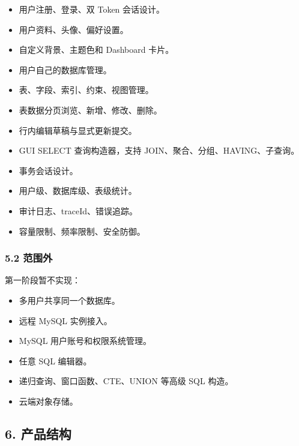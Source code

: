 \documentclass[
  a4paper,
  UTF8]{ctexart}
\providecommand{\tightlist}{%
  \setlength{\itemsep}{0pt}\setlength{\parskip}{0pt}}
\begin{document}
\begin{itemize}
\tightlist
\item
  用户注册、登录、双 Token 会话设计。
\item
  用户资料、头像、偏好设置。
\item
  自定义背景、主题色和 Dashboard 卡片。
\item
  用户自己的数据库管理。
\item
  表、字段、索引、约束、视图管理。
\item
  表数据分页浏览、新增、修改、删除。
\item
  行内编辑草稿与显式更新提交。
\item
  GUI SELECT 查询构造器，支持 JOIN、聚合、分组、HAVING、子查询。
\item
  事务会话设计。
\item
  用户级、数据库级、表级统计。
\item
  审计日志、traceId、错误追踪。
\item
  容量限制、频率限制、安全防御。
\end{itemize}

\hypertarget{ux8303ux56f4ux5916}{%
\subsubsection{5.2 范围外}\label{ux8303ux56f4ux5916}}

第一阶段暂不实现：

\begin{itemize}
\tightlist
\item
  多用户共享同一个数据库。
\item
  远程 MySQL 实例接入。
\item
  MySQL 用户账号和权限系统管理。
\item
  任意 SQL 编辑器。
\item
  递归查询、窗口函数、CTE、UNION 等高级 SQL 构造。
\item
  云端对象存储。
\end{itemize}

\hypertarget{ux4ea7ux54c1ux7ed3ux6784}{%
\subsection{6. 产品结构}\label{ux4ea7ux54c1ux7ed3ux6784}}
\end{document}
